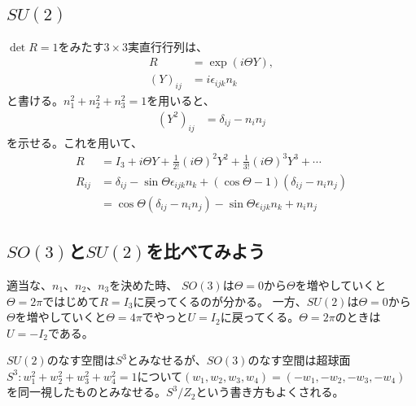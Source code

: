 \documentclass[10pt,a4paper]{jarticle}
\begin{document}
\subsection{$SU(2)$}

$\det R=1$をみたす$3\times 3$実直行行列は、
\begin{align}
R &= \exp\left( i \Theta Y \right), \\
(Y)_{ij} &= i \epsilon_{ijk} n_k
\end{align}
と書ける。$n_1^2 + n_2^2 + n_3^2 = 1$を用いると、
\begin{align}
(Y^2)_{ij} &= \delta_{ij} - n_i n_j
\end{align}
を示せる。これを用いて、
\begin{align}
R &= I_3 + i\Theta Y + \frac{1}{2!}(i\Theta)^2 Y^2 + \frac{1}{3!} (i\Theta)^3 Y^3 + \cdots \nonumber\\
R_{ij} &= \delta_{ij} - \sin\Theta \epsilon_{ijk} n_k + (\cos\Theta - 1) (\delta_{ij} - n_i n_j) \nonumber\\
&= \cos\Theta (\delta_{ij} -n_i n_j)- \sin\Theta \epsilon_{ijk} n_k +  n_i n_j
\end{align}


\subsection{$SO(3)$と$SU(2)$を比べてみよう}
適当な、$n_1$、$n_2$、$n_3$を決めた時、
$SO(3)$は$\Theta = 0$から$\Theta$を増やしていくと$\Theta=2\pi$ではじめて$R=I_3$に戻ってくるのが分かる。
一方、$SU(2)$は$\Theta = 0$から$\Theta$を増やしていくと$\Theta=4\pi$でやっと$U=I_2$に戻ってくる。$\Theta = 2\pi$のときは$U = -I_2$である。

$SU(2)$のなす空間は$S^3$とみなせるが、$SO(3)$のなす空間は超球面$S^3:w_1^2 + w_2^2 + w_3^2 + w_4^2 = 1$について$(w_1,w_2,w_3,w_4) = (-w_1,-w_2, -w_3, -w_4)$を同一視したものとみなせる。$S^3/Z_2$という書き方もよくされる。
\end{document}
